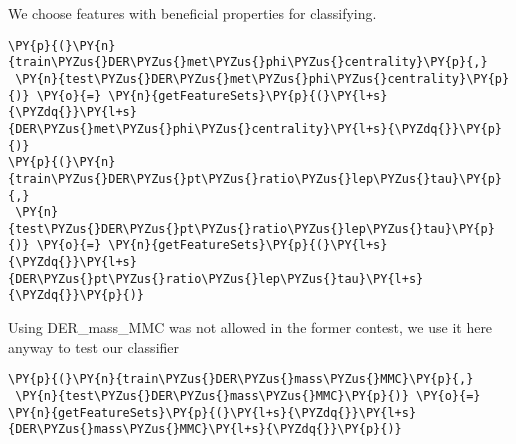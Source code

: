 We choose features with beneficial properties for classifying.


{\par%
\vspace{-1\baselineskip}%
}%
\begin{notebookcell}[]%
\begin{addmargin}[\cellleftmargin]{0em}%
{\smaller%
\par%
%
\vspace{-1\smallerfontscale}%
\begin{Verbatim}[commandchars=\\\{\}]
\PY{p}{(}\PY{n}{train\PYZus{}DER\PYZus{}met\PYZus{}phi\PYZus{}centrality}\PY{p}{,}
 \PY{n}{test\PYZus{}DER\PYZus{}met\PYZus{}phi\PYZus{}centrality}\PY{p}{)} \PY{o}{=} \PY{n}{getFeatureSets}\PY{p}{(}\PY{l+s}{\PYZdq{}}\PY{l+s}{DER\PYZus{}met\PYZus{}phi\PYZus{}centrality}\PY{l+s}{\PYZdq{}}\PY{p}{)}
\PY{p}{(}\PY{n}{train\PYZus{}DER\PYZus{}pt\PYZus{}ratio\PYZus{}lep\PYZus{}tau}\PY{p}{,}
 \PY{n}{test\PYZus{}DER\PYZus{}pt\PYZus{}ratio\PYZus{}lep\PYZus{}tau}\PY{p}{)} \PY{o}{=} \PY{n}{getFeatureSets}\PY{p}{(}\PY{l+s}{\PYZdq{}}\PY{l+s}{DER\PYZus{}pt\PYZus{}ratio\PYZus{}lep\PYZus{}tau}\PY{l+s}{\PYZdq{}}\PY{p}{)}
\end{Verbatim}
%
\par%
\vspace{-1\smallerfontscale}}%
\end{addmargin}
\end{notebookcell}


    Using DER\_mass\_MMC was not allowed in the former contest, we use it
here anyway to test our classifier


{\par%
\vspace{-1\baselineskip}%
}%
\begin{notebookcell}[]%
\begin{addmargin}[\cellleftmargin]{0em}%
{\smaller%
\par%
%
\vspace{-1\smallerfontscale}%
\begin{Verbatim}[commandchars=\\\{\}]
\PY{p}{(}\PY{n}{train\PYZus{}DER\PYZus{}mass\PYZus{}MMC}\PY{p}{,}
 \PY{n}{test\PYZus{}DER\PYZus{}mass\PYZus{}MMC}\PY{p}{)} \PY{o}{=} \PY{n}{getFeatureSets}\PY{p}{(}\PY{l+s}{\PYZdq{}}\PY{l+s}{DER\PYZus{}mass\PYZus{}MMC}\PY{l+s}{\PYZdq{}}\PY{p}{)}
\end{Verbatim}
%
\par%
\vspace{-1\smallerfontscale}}%
\end{addmargin}
\end{notebookcell}


